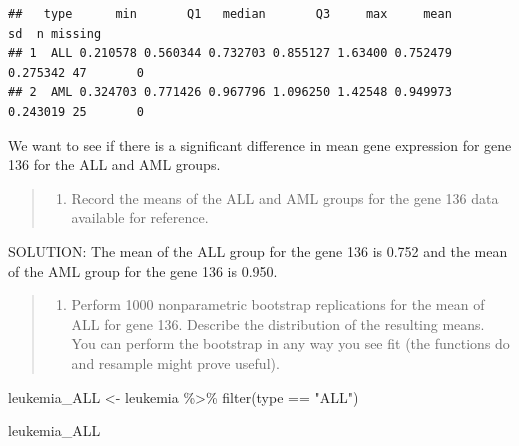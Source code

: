 \documentclass[
]{article}
\newenvironment{Shaded}{\begin{snugshade}}{\end{snugshade}}
\newcommand{\FunctionTok}[1]{\textcolor[rgb]{0.00,0.00,0.00}{#1}}
\newcommand{\NormalTok}[1]{#1}
\newcommand{\OtherTok}[1]{\textcolor[rgb]{0.56,0.35,0.01}{#1}}
\newcommand{\SpecialCharTok}[1]{\textcolor[rgb]{0.00,0.00,0.00}{#1}}
\newcommand{\StringTok}[1]{\textcolor[rgb]{0.31,0.60,0.02}{#1}}
\providecommand{\tightlist}{%
  \setlength{\itemsep}{0pt}\setlength{\parskip}{0pt}}
\begin{document}
\begin{verbatim}
##   type      min       Q1   median       Q3     max     mean       sd  n missing
## 1  ALL 0.210578 0.560344 0.732703 0.855127 1.63400 0.752479 0.275342 47       0
## 2  AML 0.324703 0.771426 0.967796 1.096250 1.42548 0.949973 0.243019 25       0
\end{verbatim}

We want to see if there is a significant difference in mean gene
expression for gene 136 for the ALL and AML groups.

\begin{quote}
\begin{enumerate}
\def\labelenumi{(\alph{enumi})}
\tightlist
\item
  Record the means of the ALL and AML groups for the gene 136 data
  available for reference.
\end{enumerate}
\end{quote}

SOLUTION: The mean of the ALL group for the gene 136 is 0.752 and the
mean of the AML group for the gene 136 is 0.950.

\begin{quote}
\begin{enumerate}
\def\labelenumi{(\alph{enumi})}
\setcounter{enumi}{1}
\tightlist
\item
  Perform 1000 nonparametric bootstrap replications for the mean of ALL
  for gene 136. Describe the distribution of the resulting means. You
  can perform the bootstrap in any way you see fit (the functions do and
  resample might prove useful).
\end{enumerate}
\end{quote}

\begin{Shaded}
\begin{Highlighting}[]
\NormalTok{leukemia\_ALL }\OtherTok{\textless{}{-}}\NormalTok{ leukemia }\SpecialCharTok{\%\textgreater{}\%}
  \FunctionTok{filter}\NormalTok{(type }\SpecialCharTok{==} \StringTok{"ALL"}\NormalTok{)}
  
\NormalTok{leukemia\_ALL}
\end{Highlighting}
\end{Shaded}
\end{document}
